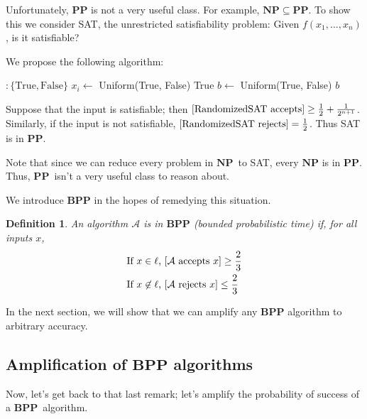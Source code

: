 \documentclass[11pt]{article}
\let\Pr\relax
\DeclareMathOperator*{\Pr}{\mathbb{P}}
\newcommand{\NP}{\ensuremath{\mathbf{NP}}}
\newcommand{\PP}{\ensuremath{\mathbf{PP}}}
\newcommand{\BPP}{\ensuremath{\mathbf{BPP}}}
\newcommand{\Alg}{\ensuremath{\mathcal{A}}}
\newtheorem{definition}[theorem]{Definition}
\begin{document}
Unfortunately, $\PP$ is not a very useful class. For example, $\NP\subseteq\PP$. To show this we consider SAT, the unrestricted satisfiability problem: Given $f(x_1, \dots, x_n)$, is it satisfiable?

We propose the following algorithm:

\begin{algorithm}[H]
\begin{algorithmic}
$: \{\mathrm{True},\mathrm{False}\}$
    \State $x_i \gets $ Uniform(True, False)
  \EndFor
    \State \Return True
  \Else
    \State $b \gets $ Uniform(True, False)
    \State \Return $b$
  \EndIf
\EndFunction
\end{algorithmic}
\end{algorithm}

Suppose that the input is satisfiable; then $\Pr[\text{RandomizedSAT accepts}] \geq \frac{1}{2} + \frac{1}{2^{n+1}}$.
Similarly, if the input is not satisfiable, $\Pr[\text{RandomizedSAT rejects}] = \frac12$.  Thus SAT is in \PP.

Note that since we can reduce every problem in \NP\ to SAT, every $\NP$ is in \PP. Thus, \PP\ isn't a very useful class to reason about.

We introduce $\BPP$ in the hopes of remedying this situation.
\begin{definition}
An algorithm $\Alg$ is in $\BPP$ (bounded probabilistic time) if, for all inputs $x$,
\begin{align*}
  &\text{If $x \in \ell$, $\Pr[\Alg \text{ accepts } x] \ge \frac23$} \\
  &\text{If $x \not\in \ell$, $\Pr[\Alg \text{ rejects } x] \le \frac23$}
\end{align*}
\end{definition}

In the next section, we will show that we can amplify any $\BPP$ algorithm to arbitrary accuracy.

\subsection{Amplification of $\BPP$ algorithms}

Now, let's get back to that last remark; let's amplify the probability of success of a \BPP\ algorithm.
\end{document}
